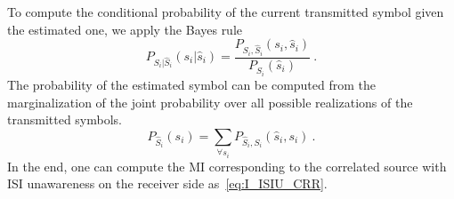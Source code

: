 \documentclass[journal]{IEEEtranTCOM}
\begin{document}
To compute the conditional probability of the current transmitted symbol given the estimated one, we apply the Bayes rule 
\begin{equation}
    P_{S_{i}|\hat{S}_{i}}({s_{i}|\hat{s}_{i}}) = \frac{P_{S_{i},\hat{S}_{i}}(s_{i},\hat{s}_{i})}{P_{\hat{S}_{i}}(\hat{s}_{i})}~.
\end{equation}
The probability of the estimated symbol can be computed from the marginalization of the joint probability over all possible realizations of the transmitted symbols.
\begin{equation}
    P_{\hat{S}_{i}}(s_{i}) = \sum_{\forall s_{i}}P_{\hat{S}_{i},S_{i}}(\hat{s}_{i},s_{i})~.
\end{equation}
In the end, one can compute the MI corresponding to the correlated source with ISI unawareness on the receiver side as~\eqref{eq:I_ISIU_CRR}.
\end{document}

